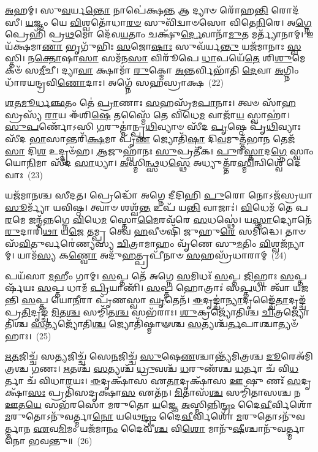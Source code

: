 \-\ul{𑌅}\-𑌹𑌮𑍍। 𑌸𑍁\-\ul{𑌵}\-𑌰𑍍𑌯\-\ul{𑌨𑍍𑌤𑍋} 𑌨𑌾𑌪𑍇॑𑌕𑍍𑌷\-\ul{𑌨𑍍𑌤} 𑌆 𑌦𑍍𑌯𑌾𑍞 𑌰𑍋᳴𑌹\-\ul{𑌨𑍍𑌤𑌿} 𑌰𑍋𑌦᳴𑌸𑍀। \ul{𑌯}\-𑌜𑍍𑌞𑌂 𑌯𑍇 \ul{𑌵𑌿}\-𑌶𑍍𑌵𑌤𑍋᳴𑌧𑌾\-\ul{𑌰}\-\-\ul{𑍞} 𑌸𑍁𑌵𑌿᳴𑌦𑍍𑌵𑌾𑍞𑌸𑍋 𑌵𑌿𑌤𑍇\-\ul{𑌨𑌿}\-𑌰𑍇। 𑌅\-\ul{𑌗𑍍𑌨𑍇} 𑌪𑍍𑌰𑍇𑌹𑌿᳴ 𑌪𑍍𑌰\-\ul{𑌥}\-𑌮𑍋 𑌦𑍇᳴𑌵\-\ul{𑌯}\-𑌤𑌾𑌂 𑌚𑌕𑍍𑌷𑍁᳴\-\ul{𑌰𑍍𑌦𑍇}\-𑌵𑌾𑌨𑌾᳴\-\ul{𑌮𑍁}\-𑌤 𑌮𑌰𑍍𑌤𑍍𑌯𑌾᳴𑌨𑌾𑌮𑍍। 𑌇𑌯᳴𑌕𑍍𑌷𑌮𑌾\-\ul{𑌣𑌾} 𑌭𑍃𑌗𑍁᳴𑌭𑌿𑌃 \ul{𑌸}\-𑌜𑍋\-\ul{𑌷𑌾𑌃} 𑌸𑍁𑌵᳴𑌰𑍍𑌯\-\ul{𑌨𑍍𑌤𑍁} 𑌯𑌜᳴𑌮𑌾𑌨𑌾𑌃 \ul{𑌸𑍍𑌵}\-𑌸𑍍𑌤𑌿। 𑌨\-\ul{𑌕𑍍𑌤𑍋}\-𑌷𑌾\-\ul{𑌸𑌾} 𑌸𑌮᳴𑌨\-\ul{𑌸𑌾} 𑌵𑌿𑌰𑍂᳴𑌪𑍇 \ul{𑌧𑌾}\-𑌪𑌯𑍇᳴\-\ul{𑌤𑍇} 𑌶𑌿\-\ul{𑌶𑍁}\-𑌮𑍇𑌕𑍞᳴ 𑌸\-\ul{𑌮𑍀}\-𑌚𑍀। 𑌦𑍍𑌯𑌾\-\ul{𑌵𑌾} 𑌕𑍍𑌷𑌾𑌮𑌾᳴ \ul{𑌰𑍁}\-𑌕𑍍𑌮𑍋 \ul{𑌅}\-𑌨𑍍𑌤𑌰𑍍𑌵𑌿𑌭𑌾᳴𑌤𑌿 \ul{𑌦𑍇}\-𑌵𑌾 \ul{𑌅}\-𑌗𑍍𑌨𑌿𑌂 𑌧𑌾᳴𑌰𑌯𑌨𑍍𑌦𑍍𑌰𑌵𑌿\-\ul{𑌣𑍋}\-𑌦𑌾𑌃। 𑌅𑌗𑍍𑌨𑍇᳴ 𑌸𑌹𑌸𑍍𑌰𑌾𑌕𑍍𑌷~(22)

\-\ul{𑌶}\-\-\ul{𑌤}\-\-\ul{𑌮𑍂}\-\-\ul{𑌰𑍍𑌧}\-\-\ul{𑌞𑍍𑌛}\-𑌤𑌂 𑌤𑍇॑ \ul{𑌪𑍍𑌰𑌾}\-𑌣𑌾𑌃 \ul{𑌸}\-𑌹𑌸𑍍𑌰᳴𑌮\-\ul{𑌪𑌾}\-𑌨𑌾𑌃। 𑌤𑍍𑌵𑍞 𑌸𑌾᳴\-\ul{𑌹}\-𑌸𑍍𑌰𑌸𑍍𑌯᳴ \ul{𑌰𑌾}\-𑌯 𑌈᳴𑌶𑌿\-\ul{𑌷𑍇} 𑌤𑌸𑍍𑌮𑍈᳴ 𑌤𑍇 𑌵𑌿𑌧𑍇\-\ul{𑌮} 𑌵𑌾𑌜𑌾᳴\-\ul{𑌯} 𑌸𑍍𑌵𑌾𑌹𑌾॑। \ul{𑌸𑍁}\-\-\ul{𑌪}\-𑌰𑍍𑌣𑍋᳴\-𑌽𑌸𑌿 \ul{𑌗}\-𑌰𑍁𑌤𑍍𑌮𑌾॑𑌨𑍍𑌪𑍃\-\ul{𑌥𑌿}\-𑌵𑍍𑌯𑌾𑍞 𑌸𑍀᳴𑌦 \ul{𑌪𑍃}\-𑌷𑍍𑌠𑍇 𑌪𑍃᳴\-\ul{𑌥𑌿}\-𑌵𑍍𑌯𑌾𑌃 𑌸𑍀᳴𑌦 \ul{𑌭𑌾}\-𑌸𑌾𑌨𑍍𑌤𑌰𑌿᳴\-\ul{𑌕𑍍𑌷}\-𑌮𑌾 𑌪𑍃᳴\-\ul{𑌣} 𑌜𑍍𑌯𑍋𑌤𑌿᳴\-\ul{𑌷𑌾} 𑌦𑌿\-\ul{𑌵}\-𑌮𑍁𑌤𑍍𑌤᳴𑌭𑌾\-\ul{𑌨} 𑌤𑍇𑌜᳴\-\ul{𑌸𑌾} 𑌦𑌿\-\ul{𑌶} 𑌉𑌦𑍍𑌦𑍃𑍞᳴𑌹। \ul{𑌆}\-𑌜𑍁𑌹𑍍𑌵𑌾᳴𑌨𑌃 \ul{𑌸𑍁}\-𑌪𑍍𑌰𑌤𑍀᳴𑌕𑌃 \ul{𑌪𑍁}\-𑌰\-\ul{𑌸𑍍𑌤𑌾}\-𑌦\-\ul{𑌗𑍍𑌨𑍇} 𑌸𑍍𑌵𑌾𑌂 𑌯𑍋\-\ul{𑌨𑌿}\-𑌮𑌾 𑌸𑍀᳴𑌦 \ul{𑌸𑌾}\-𑌧𑍍𑌯𑌾। \ul{𑌅}\-𑌸𑍍𑌮𑌿\-\ul{𑌨𑍍𑌥𑍍𑌸}\-𑌧\-\ul{𑌸𑍍𑌥𑍇} 𑌅𑌧𑍍𑌯𑍁𑌤𑍍𑌤᳴𑌰\-\ul{𑌸𑍍𑌮𑌿}\-𑌨𑍍𑌵𑌿𑌶𑍍𑌵𑍇᳴ 𑌦𑍇𑌵𑌾𑌃~(23)

𑌯𑌜᳴𑌮𑌾𑌨𑌶𑍍𑌚 𑌸𑍀𑌦𑌤। 𑌪𑍍𑌰𑍇𑌦𑍍𑌧𑍋᳴ 𑌅𑌗𑍍𑌨𑍇 𑌦𑍀𑌦𑌿𑌹𑌿 \ul{𑌪𑍁}\-𑌰𑍋 𑌨𑍋\-𑌽𑌜᳴𑌸𑍍𑌰𑌯𑌾 \ul{𑌸𑍂}\-𑌰𑍍𑌮𑍍𑌯𑌾᳴ 𑌯𑌵𑌿𑌷𑍍𑌠। 𑌤𑍍𑌵𑌾𑍞 𑌶𑌶𑍍𑌵᳴\-\ul{𑌨𑍍𑌤} 𑌉𑌪᳴ 𑌯\-\ul{𑌨𑍍𑌤𑌿} 𑌵𑌾𑌜𑌾𑌃॑। \ul{𑌵𑌿}\-𑌧𑍇𑌮᳴ 𑌤𑍇 𑌪\-\ul{𑌰}\-𑌮𑍇 𑌜𑌨𑍍𑌮᳴𑌨𑍍𑌨𑌗𑍍𑌨𑍇 \ul{𑌵𑌿}\-𑌧𑍇\-\ul{𑌮} 𑌸𑍍𑌤𑍋\-\ul{𑌮𑍈}\-𑌰𑌵᳴𑌰𑍇 \ul{𑌸}\-𑌧𑌸𑍍𑌥𑍇॑। 𑌯\-\ul{𑌸𑍍𑌮𑌾}\-𑌦𑍍𑌯𑍋𑌨𑍇᳴\-\ul{𑌰𑍁}\-𑌦𑌾𑌰𑌿᳴\-\ul{𑌥𑌾} 𑌯\-\ul{𑌜𑍇} 𑌤𑌮𑍍𑌪𑍍𑌰 𑌤𑍍𑌵𑍇 \ul{𑌹}\-𑌵𑍀𑍞𑌷𑌿᳴ 𑌜𑍁𑌹𑍁\-\ul{𑌰𑍇} 𑌸𑌮𑌿᳴𑌦𑍍𑌧𑍇। 𑌤𑌾𑍞 𑌸᳴\-\ul{𑌵𑌿}\-𑌤𑍁𑌰𑍍𑌵𑌰𑍇॑𑌣𑍍𑌯𑌸𑍍𑌯 \ul{𑌚𑌿}\-𑌤𑍍𑌰𑌾𑌮𑌾𑌹𑌂 𑌵𑍃᳴𑌣𑍇 𑌸𑍁\-\ul{𑌮}\-𑌤𑌿𑌂 \ul{𑌵𑌿}\-𑌶𑍍𑌵𑌜᳴𑌨𑍍𑌯𑌾𑌮𑍍। 𑌯𑌾𑌮᳴\-\ul{𑌸𑍍𑌯} 𑌕\-\ul{𑌣𑍍𑌵𑍋} 𑌅𑌦𑍁᳴\-\ul{𑌹}\-𑌤𑍍𑌪𑍍𑌰𑌪𑍀᳴𑌨𑌾𑍞 \ul{𑌸}\-𑌹𑌸𑍍𑌰᳴𑌧𑌾𑌰𑌾𑌮𑍍~(24)

𑌪𑌯᳴𑌸𑌾 \ul{𑌮}\-𑌹𑍀𑌂 𑌗𑌾𑌮𑍍। \ul{𑌸}\-𑌪𑍍𑌤 𑌤𑍇᳴ 𑌅𑌗𑍍𑌨𑍇 \ul{𑌸}\-𑌮𑌿𑌧𑌃᳴ \ul{𑌸}\-𑌪𑍍𑌤 \ul{𑌜𑌿}\-𑌹𑍍𑌵𑌾𑌃 \ul{𑌸}\-𑌪𑍍𑌤𑌰𑍍\mbox{}𑌷᳴𑌯𑌃 \ul{𑌸}\-𑌪𑍍𑌤 𑌧𑌾𑌮᳴ \ul{𑌪𑍍𑌰𑌿}\-𑌯𑌾𑌣𑌿᳴। \ul{𑌸}\-𑌪𑍍𑌤 𑌹𑍋𑌤𑍍𑌰𑌾𑌃॑ 𑌸\-\ul{𑌪𑍍𑌤}\-𑌧𑌾 𑌤𑍍𑌵𑌾᳴ 𑌯𑌜𑌨𑍍𑌤𑌿 \ul{𑌸}\-𑌪𑍍𑌤 𑌯𑍋\-\ul{𑌨𑍀}\-𑌰𑌾 𑌪𑍃᳴𑌣𑌸𑍍𑌵𑌾 \ul{𑌘𑍃}\-𑌤𑍇𑌨᳴। \ul{𑌈}\-𑌦𑍃𑌙𑍍𑌚𑌾॑\-\ul{𑌨𑍍𑌯𑌾}\-𑌦𑍃𑌙𑍍𑌚𑍈᳴\-\ul{𑌤𑌾}\-𑌦𑍃𑌙𑍍𑌚᳴ 𑌪𑍍𑌰\-\ul{𑌤𑌿}\-𑌦𑍃𑌙𑍍𑌚᳴ \ul{𑌮𑌿}\-𑌤\-\ul{𑌶𑍍𑌚} 𑌸𑌮𑍍𑌮𑌿᳴𑌤\-\ul{𑌶𑍍𑌚} 𑌸𑌭᳴𑌰𑌾𑌃। \ul{𑌶𑍁}\-𑌕𑍍𑌰𑌜𑍍𑌯𑍋᳴𑌤𑌿𑌶𑍍𑌚 \ul{𑌚𑌿}\-𑌤𑍍𑌰𑌜𑍍𑌯𑍋᳴𑌤𑌿𑌶𑍍𑌚 \ul{𑌸}\-𑌤𑍍𑌯𑌜𑍍𑌯𑍋᳴𑌤𑌿\-\ul{𑌶𑍍𑌚} 𑌜𑍍𑌯𑍋𑌤𑌿᳴𑌷𑍍𑌮𑌾𑍟𑌶𑍍𑌚 \ul{𑌸}\-𑌤𑍍𑌯𑌶𑍍𑌚᳴\-\ul{𑌰𑍍𑌤}\-𑌪𑌾𑌶𑍍𑌚𑌾𑌤𑍍𑌯𑍞᳴𑌹𑌾𑌃।~(25)

\-\ul{𑌋}\-\-\ul{𑌤}\-𑌜𑌿𑌚𑍍𑌚᳴ 𑌸\-\ul{𑌤𑍍𑌯}\-𑌜𑌿𑌚𑍍𑌚᳴ 𑌸𑍇\-\ul{𑌨}\-𑌜𑌿𑌚𑍍𑌚᳴ \ul{𑌸𑍁}\-𑌷𑍇\-\ul{𑌣}\-𑌶𑍍𑌚𑌾𑌨𑍍𑌤𑍍𑌯᳴𑌮𑌿𑌤𑍍𑌰𑌶𑍍𑌚 \ul{𑌦𑍂}\-𑌰𑍇𑌅᳴𑌮𑌿𑌤𑍍𑌰𑌶𑍍𑌚 \ul{𑌗}\-𑌣𑌃। \ul{𑌋}\-𑌤𑌶𑍍𑌚᳴ \ul{𑌸}\-𑌤𑍍𑌯𑌶𑍍𑌚᳴ \ul{𑌧𑍍𑌰𑍁}\-𑌵𑌶𑍍𑌚᳴ \ul{𑌧}\-𑌰𑍁𑌣᳴𑌶𑍍𑌚 \ul{𑌧}\-𑌰𑍍𑌤𑌾 𑌚᳴ 𑌵𑌿\-\ul{𑌧}\-𑌰𑍍𑌤𑌾 𑌚᳴ 𑌵𑌿𑌧𑌾\-\ul{𑌰}\-𑌯𑌃। \ul{𑌈}\-𑌦𑍃𑌕𑍍𑌷𑌾᳴𑌸 𑌏\-\ul{𑌤𑌾}\-𑌦𑍃𑌕𑍍𑌷𑌾᳴𑌸 \ul{𑌊} 𑌷𑍁 𑌣𑌃᳴ \ul{𑌸}\-𑌦𑍃𑌕𑍍𑌷𑌾᳴\-\ul{𑌸𑌃} 𑌪𑍍𑌰𑌤𑌿᳴𑌸𑌦𑍃𑌕𑍍𑌷𑌾\-\ul{𑌸} 𑌏𑌤᳴𑌨। \ul{𑌮𑌿}\-𑌤𑌾𑌸᳴\-\ul{𑌶𑍍𑌚} 𑌸𑌮𑍍𑌮𑌿᳴𑌤𑌾𑌸𑌶𑍍𑌚 𑌨 \ul{𑌊}\-𑌤\-\ul{𑌯𑍇} 𑌸𑌭᳴𑌰𑌸𑍋 𑌮𑌰𑍁𑌤𑍋 \ul{𑌯}\-𑌜𑍍𑌞𑍇 \ul{𑌅}\-𑌸𑍍𑌮𑌿𑌨𑍍𑌨𑌿\-\ul{𑌨𑍍𑌦𑍍𑌰𑌂} 𑌦𑍈\-\ul{𑌵𑍀}\-𑌰𑍍𑌵𑌿𑌶𑍋᳴ \ul{𑌮}\-𑌰𑍁𑌤𑍋\-𑌽𑌨𑍁᳴𑌵𑌰𑍍𑌤𑍍𑌮𑌾\-\ul{𑌨𑍋} 𑌯𑌥𑍇\-\ul{𑌨𑍍𑌦𑍍𑌰𑌂} 𑌦𑍈\-\ul{𑌵𑍀}\-𑌰𑍍𑌵𑌿𑌶𑍋᳴ \ul{𑌮}\-𑌰𑍁𑌤𑍋\-𑌽𑌨𑍁᳴𑌵𑌰𑍍𑌤𑍍𑌮𑌾𑌨 \ul{𑌏}\-𑌵\-\ul{𑌮𑌿}\-𑌮𑌂 𑌯𑌜᳴𑌮𑌾\-\ul{𑌨𑌂} 𑌦𑍈𑌵𑍀॑\-\ul{𑌶𑍍𑌚} 𑌵𑌿\-\ul{𑌶𑍋} 𑌮𑌾𑌨𑍁᳴\-\ul{𑌷𑍀}\-𑌶𑍍𑌚𑌾𑌨𑍁᳴𑌵𑌰𑍍𑌤𑍍𑌮𑌾𑌨𑍋 𑌭𑌵𑌨𑍍𑌤𑍁॥~(26)

